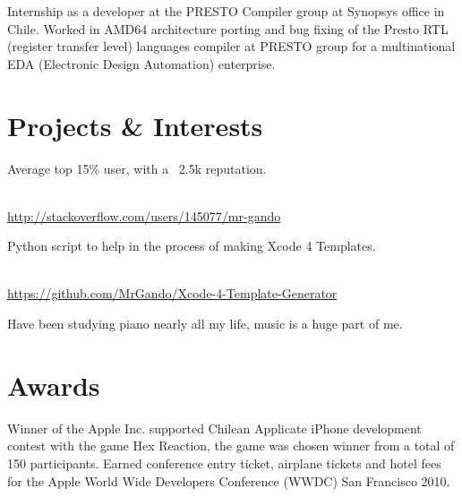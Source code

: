 \documentclass[10pt, a4paper]{moderncv}
\newcommand\Colorhref[1]{\small\textcolor{RoyalBlue}{\url{#1}}}
\begin{document}
{
\begin{scriptsize}
Internship as a developer at the PRESTO Compiler group at Synopsys office in Chile. Worked in AMD64 architecture porting and bug fixing of the Presto RTL (register transfer level) languages compiler at
PRESTO group for a multinational EDA (Electronic Design Automation) enterprise. \\
\end{scriptsize}
}

\section{Projects \& Interests}
{
\begin{small}Average top 15\% user, with a ~2.5k reputation.\end{small}\\
\Colorhref{http://stackoverflow.com/users/145077/mr-gando}\\
}
{
\begin{small}Python script to help in the process of making Xcode 4 Templates.\end{small}\\
\Colorhref{ https://github.com/MrGando/Xcode-4-Template-Generator}\\
}
{
Have been studying piano nearly all my life, music is a huge part of me.
}

\section{Awards}
{
\begin{scriptsize}
Winner of the Apple Inc. supported Chilean Applicate iPhone development contest with the game Hex Reaction, the game was chosen winner from a total of 150 participants. Earned conference entry ticket, airplane tickets and hotel fees for the Apple World Wide Developers Conference (WWDC) San Francisco 2010.\\
\end{scriptsize}
}
\end{document}
